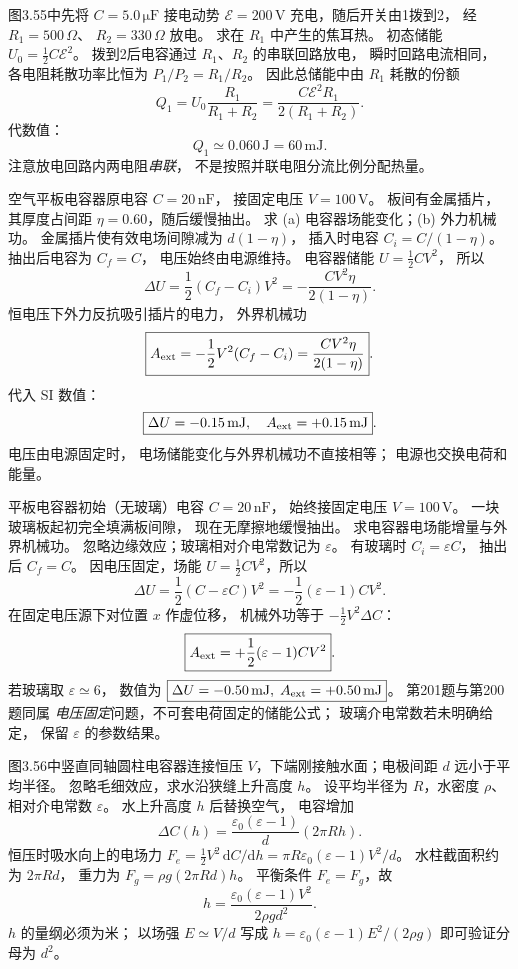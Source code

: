 图3.55中先将 $C=5.0\,\mathrm{\mu F}$
接电动势 $\mathcal E=200\,\mathrm V$
充电，随后开关由1拨到2，
经 $R_1=500\,\Omega$、
$R_2=330\,\Omega$ 放电。
求在 $R_1$ 中产生的焦耳热。
\exsolution
初态储能
$U_0=\frac12C\mathcal E^2$。
拨到2后电容通过
$R_1$、$R_2$ 的串联回路放电，
瞬时回路电流相同，
各电阻耗散功率比恒为
$P_1/P_2=R_1/R_2$。
因此总储能中由 $R_1$ 耗散的份额
\[
Q_1=U_0\frac{R_1}{R_1+R_2}
=\boxed{\frac{C\mathcal E^2R_1}{2(R_1+R_2)}}.
\]
代数值：
\[
\boxed{Q_1\simeq0.060\,\mathrm J=60\,\mathrm{mJ}}.
\]
\excheck 注意放电回路内两电阻\emph{串联}，
不是按照并联电阻分流比例分配热量。

空气平板电容器原电容
$C=20\,\mathrm{nF}$，
接固定电压 $V=100\,\mathrm V$。
板间有金属插片，其厚度占间距
$\eta=0.60$，随后缓慢抽出。
求 (a) 电容器场能变化；(b) 外力机械功。
\exsolution
金属插片使有效电场间隙减为
$d(1-\eta)$，
插入时电容
$C_i=C/(1-\eta)$。
抽出后电容为 $C_f=C$，
电压始终由电源维持。
电容器储能 $U=\frac12CV^2$，
所以
\[
\boxed{\Delta U=
\frac12(C_f-C_i)V^2
=-\frac{CV^2\eta}{2(1-\eta)}}.
\]
恒电压下外力反抗吸引插片的电力，
外界机械功
\[
\boxed{A_{\rm ext}=-\frac12V^2(C_f-C_i)
=\frac{CV^2\eta}{2(1-\eta)}}.
\]
代入 SI 数值：
\[
\boxed{\Delta U=-0.15\,\mathrm{mJ},
\quad A_{\rm ext}=+0.15\,\mathrm{mJ}}.
\]
\excheck 电压由电源固定时，
电场储能变化与外界机械功不直接相等；
电源也交换电荷和能量。

平板电容器初始（无玻璃）电容
$C=20\,\mathrm{nF}$，
始终接固定电压 $V=100\,\mathrm V$。
一块玻璃板起初完全填满板间隙，
现在无摩擦地缓慢抽出。
求电容器电场能增量与外界机械功。
\exsolution
忽略边缘效应；玻璃相对介电常数记为 $\varepsilon$。
有玻璃时 $C_i=\varepsilon C$，
抽出后 $C_f=C$。
因电压固定，场能
$U=\frac12CV^2$，所以
\[
\boxed{\Delta U=
\frac12(C-\varepsilon C)V^2
=-\frac12(\varepsilon-1)CV^2}.
\]
在固定电压源下对位置 $x$ 作虚位移，
机械外功等于
$-\frac12V^2\Delta C$：
\[
\boxed{A_{\rm ext}=
+\frac12(\varepsilon-1)CV^2}.
\]
若玻璃取 $\varepsilon\simeq6$，
数值为
$\boxed{\Delta U=-0.50\,\mathrm{mJ},\;
A_{\rm ext}=+0.50\,\mathrm{mJ}}$。
\excheck 第201题与第200题同属
\emph{电压固定}问题，不可套电荷固定的储能公式；
玻璃介电常数若未明确给定，
保留 $\varepsilon$ 的参数结果。

图3.56中竖直同轴圆柱电容器连接恒压
$V$，下端刚接触水面；电极间距
$d$ 远小于平均半径。
忽略毛细效应，求水沿狭缝上升高度 $h$。
\exsolution
设平均半径为 $R$，水密度 $\rho$、
相对介电常数 $\varepsilon$。
水上升高度 $h$ 后替换空气，
电容增加
\[
\Delta C(h)=\frac{\varepsilon_0(\varepsilon-1)}
d(2\pi Rh).
\]
恒压时吸水向上的电场力
$F_e=\frac12V^2\,\mathrm dC/\mathrm dh
=\pi R\varepsilon_0(\varepsilon-1)V^2/d$。
水柱截面积约为 $2\pi Rd$，
重力为 $F_g=\rho g(2\pi Rd)h$。
平衡条件 $F_e=F_g$，故
\[
\boxed{h=
\frac{\varepsilon_0(\varepsilon-1)V^2}
{2\rho gd^2}}.
\]
\excheck $h$ 的量纲必须为米；
以场强 $E\simeq V/d$ 写成
$h=\varepsilon_0(\varepsilon-1)E^2/(2\rho g)$
即可验证分母为 $d^2$。

